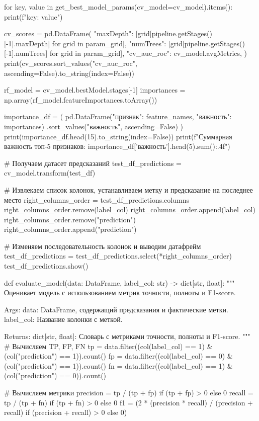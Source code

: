 \begin{code}
for key, value in get_best_model_params(cv_model=cv_model).items():
    print(f"{key}: {value}")

cv_scores = pd.DataFrame({
    "maxDepth": [grid[pipeline.getStages()[-1].maxDepth] for grid in param_grid],
    "numTrees": [grid[pipeline.getStages()[-1].numTrees] for grid in param_grid],
    "cv_auc_roc": cv_model.avgMetrics,
})
print(cv_scores.sort_values("cv_auc_roc", ascending=False).to_string(index=False))

rf_model = cv_model.bestModel.stages[-1]
importances = np.array(rf_model.featureImportances.toArray())

importance_df = (
    pd.DataFrame({"признак": feature_names, "важность": importances})
    .sort_values("важность", ascending=False)
)
print(importance_df.head(15).to_string(index=False))
print(f"Суммарная важность топ-5 признаков: {importance_df['важность'].head(5).sum():.4f}")

# Получаем датасет предсказаний
test_df_predictions = cv_model.transform(test_df)

# Извлекаем список колонок, устанавливаем метку и предсказание на последнее место
right_columns_order = test_df_predictions.columns
right_columns_order.remove(label_col)
right_columns_order.append(label_col)
right_columns_order.remove("prediction")
right_columns_order.append("prediction")

# Изменяем последовательность колонок и выводим датафрейм
test_df_predictions = test_df_predictions.select(*right_columns_order)
test_df_predictions.show()

def evaluate_model(data: DataFrame, label_col: str) -> dict[str, float]:
    """
    Оценивает модель с использованием метрик точности, полноты и F1-score.

    Args:
        data: DataFrame, содержащий предсказания и фактические метки.
        label_col: Название колонки с меткой.

    Returns:
        dict[str, float]: Словарь с метриками точности, полноты и F1-score.
    """
    # Вычисляем TP, FP, FN
    tp = data.filter((col(label_col) == 1) &
                     (col("prediction") == 1)).count()
    fp = data.filter((col(label_col) == 0) &
                     (col("prediction") == 1)).count()
    fn = data.filter((col(label_col) == 1) &
                     (col("prediction") == 0)).count()

    # Вычисляем метрики
    precision = tp / (tp + fp) if (tp + fp) > 0 else 0
    recall = tp / (tp + fn) if (tp + fn) > 0 else 0
    f1 = (2 * (precision * recall) / (precision + recall)
          if (precision + recall) > 0 else 0)


\end{code}

